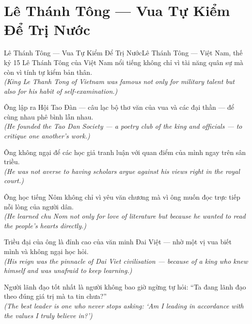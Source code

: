 \section{Lê Thánh Tông --- Vua Tự Kiểm Để Trị Nước}
\begin{truyen}{Lê Thánh Tông --- Vua Tự Kiểm Để Trị Nước}{Lê Thánh Tông --- Việt Nam, thế kỷ 15}
 Lê Thánh Tông của Việt Nam nổi tiếng không chỉ vì tài năng quân sự mà còn vì tính tự kiểm bản thân.\\[4pt]
\textit{(King Le Thanh Tong of Vietnam was famous not only for military talent but also for his habit of self-examination.)}

Ông lập ra Hội Tao Đàn --- câu lạc bộ thơ văn của vua và các đại thần --- để cùng nhau phê bình lẫn nhau.\\[4pt]
\textit{(He founded the Tao Dan Society --- a poetry club of the king and officials --- to critique one another's work.)}

Ông không ngại để các học giả tranh luận với quan điểm của mình ngay trên sân triều.\\[4pt]
\textit{(He was not averse to having scholars argue against his views right in the royal court.)}

Ông học tiếng Nôm không chỉ vì yêu văn chương mà vì ông muốn đọc trực tiếp nỗi lòng của người dân.\\[4pt]
\textit{(He learned chu Nom not only for love of literature but because he wanted to read the people's hearts directly.)}

Triều đại của ông là đỉnh cao của văn minh Đai Việt --- nhờ một vị vua biết mình và không ngại học hỏi.\\[4pt]
\textit{(His reign was the pinnacle of Dai Viet civilisation --- because of a king who knew himself and was unafraid to keep learning.)}

\end{truyen}
\begin{baihoc}
  Người lãnh đạo tốt nhất là người không bao giờ ngừng tự hỏi: ``Ta đang lãnh đạo theo đúng giá trị mà ta tin chưa?''\\[4pt]
  \textit{(The best leader is one who never stops asking: `Am I leading in accordance with the values I truly believe in?')}
\end{baihoc}


